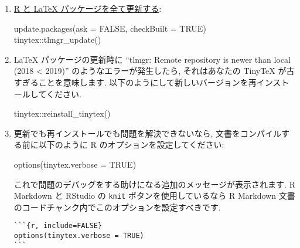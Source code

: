 \documentclass[
  xelatex,ja=standard,jafont=noto]{bxjsreport}
\newenvironment{Shaded}{\begin{snugshade}}{\end{snugshade}}
\newcommand{\AttributeTok}[1]{\textcolor[rgb]{0.77,0.63,0.00}{#1}}
\newcommand{\ConstantTok}[1]{\textcolor[rgb]{0.00,0.00,0.00}{#1}}
\newcommand{\FunctionTok}[1]{\textcolor[rgb]{0.00,0.00,0.00}{#1}}
\newcommand{\NormalTok}[1]{#1}
\newcommand{\SpecialCharTok}[1]{\textcolor[rgb]{0.00,0.00,0.00}{#1}}
\begin{document}
\begin{enumerate}
\def\labelenumi{\arabic{enumi}.}
\item
  \href{https://yihui.org/en/2017/05/when-in-doubt-upgrade/}{R と LaTeX
  パッケージを全て更新する}:

\begin{Shaded}
\begin{Highlighting}[numbers=left,,]
\FunctionTok{update.packages}\NormalTok{(}\AttributeTok{ask =} \ConstantTok{FALSE}\NormalTok{, }\AttributeTok{checkBuilt =} \ConstantTok{TRUE}\NormalTok{)}
\NormalTok{tinytex}\SpecialCharTok{::}\FunctionTok{tlmgr\_update}\NormalTok{()}
\end{Highlighting}
\end{Shaded}
\item
  LaTeX パッケージの更新時に ``tlmgr: Remote repository is newer than
  local (2018 \textless{} 2019)'' のようなエラーが発生したら,
  それはあなたの TinyTeX が古すぎることを意味します.
  以下のようにして新しいバージョンを再インストールしてください.

\begin{Shaded}
\begin{Highlighting}[numbers=left,,]
\NormalTok{tinytex}\SpecialCharTok{::}\FunctionTok{reinstall\_tinytex}\NormalTok{()}
\end{Highlighting}
\end{Shaded}
\item
  更新でも再インストールでも問題を解決できないなら,
  文書をコンパイルする前に以下のように R のオプションを設定してください:

\begin{Shaded}
\begin{Highlighting}[numbers=left,,]
\FunctionTok{options}\NormalTok{(}\AttributeTok{tinytex.verbose =} \ConstantTok{TRUE}\NormalTok{)}
\end{Highlighting}
\end{Shaded}

  これで問題のデバッグをする助けになる追加のメッセージが表示されます. R
  Markdown と RStudio の \texttt{knit} ボタンを使用しているなら R
  Markdown 文書のコードチャンク内でこのオプションを設定すべきです.

\begin{verbatim}
```{r, include=FALSE}
options(tinytex.verbose = TRUE)
```
\end{verbatim}


\end{enumerate}
\end{document}

